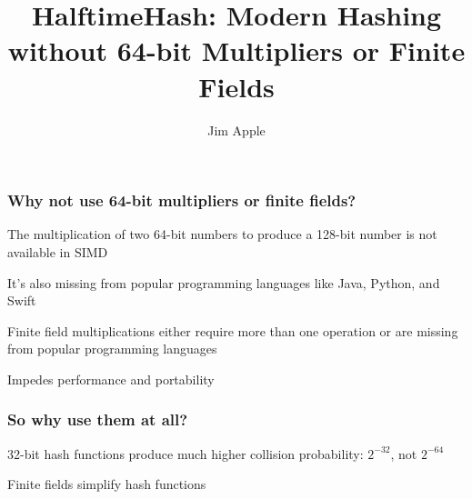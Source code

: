 \documentclass[xcolor=dvipsnames]{beamer}
\begin{document}
\title{HalftimeHash: Modern Hashing without 64-bit Multipliers or Finite Fields}
\author{Jim Apple}
\date{}

\frame{\titlepage}




\begin{frame}
  \frametitle{Why not use 64-bit multipliers or finite fields?}
  The multiplication of two 64-bit numbers to produce a 128-bit number is not available in SIMD %
  \pause

  $ $\\
  It's also missing from popular programming languages like Java, Python, and Swift
  \pause

  $ $\\
  Finite field multiplications either require more than one operation or are missing from popular programming languages
  \pause

  $ $\\
  Impedes performance and portability
\end{frame}

\begin{frame}
  \frametitle{So why use them at all?}
  32-bit hash functions produce much higher collision probability: $2^{-32}$, not $2^{-64}$
  \pause

  $ $\\
  Finite fields simplify hash functions
\end{frame}
\end{document}

